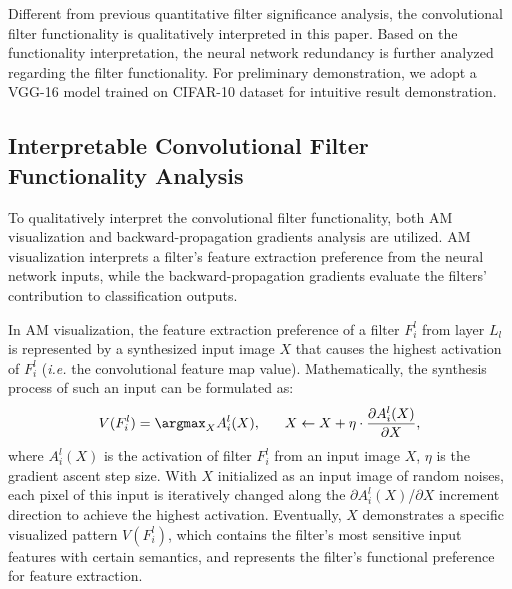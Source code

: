 \documentclass{article} %
\begin{document}
Different from previous quantitative filter significance analysis, the convolutional filter functionality is qualitatively interpreted in this paper.
	Based on the functionality interpretation, the neural network redundancy is further analyzed regarding the filter functionality.
	For preliminary demonstration, we adopt a VGG-16 model trained on CIFAR-10 dataset for intuitive result demonstration.

\subsection{Interpretable Convolutional Filter Functionality Analysis}%
To qualitatively interpret the convolutional filter functionality, both AM visualization and backward-propagation gradients analysis are utilized.
AM visualization interprets a filter's feature extraction preference from the neural network inputs, while the backward-propagation gradients evaluate the filters' contribution to classification outputs.

In AM visualization, the feature extraction preference of a filter $F_i^l$ from layer $L_l$ is represented by a synthesized input image $X$ that causes the highest activation of $F_i^l$ (\textit{i.e.} the convolutional feature map value).
	Mathematically, the synthesis process of such an input can be formulated as:
\begin{equation}
	V(F^l_i)=\argmax_{X} {A^l_i(X),
	\hspace{0.6cm} X \leftarrow X} + \eta \cdot \frac{\partial A^l_i(X)}{ \partial X},
	\label{eq:am}
\end{equation}
where $A^l_i(X)$ is the activation of filter $F_i^l$ from an input image $X$, $\eta$ is the gradient ascent step size.
	With $X$ initialized as an input image of random noises, each pixel of this input is iteratively changed along the $\partial A^l_i(X)$/$\partial X$ increment direction to achieve the highest activation.
	Eventually, $X$ demonstrates a specific visualized pattern $V(F^l_i)$, which contains the filter's most sensitive input features with certain semantics, and represents the filter's functional preference for feature extraction.
\end{document}
